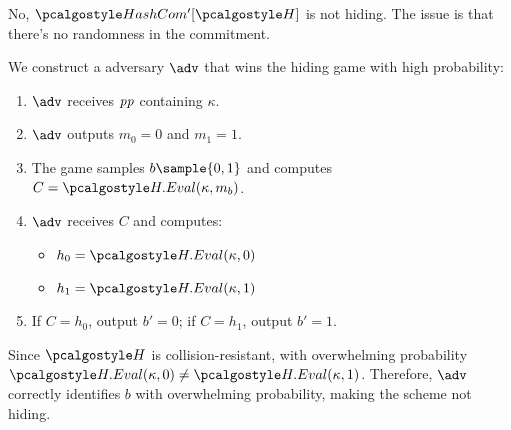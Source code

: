 \ifsolutions
\begin{mysolution}
  No, $\algo{HashCom'}[\algo{H}]$ is not hiding.
  The issue is that there's no randomness in the commitment.
  
  We construct a \ppt adversary $\adv$ that wins the hiding game with high probability:
  
  \begin{enumerate}
    \item $\adv$ receives $\mathit{pp}$ containing $\kappa$.
    \item $\adv$ outputs $m_0 = 0$ and $m_1 = 1$.
    \item The game samples $b \sample \{0, 1\}$ and computes $C = \algo{H.Eval}(\kappa, m_b)$.
    \item $\adv$ receives $C$ and computes:
      \begin{itemize}
        \item $h_0 = \algo{H.Eval}(\kappa, 0)$
        \item $h_1 = \algo{H.Eval}(\kappa, 1)$
      \end{itemize}
    \item If $C = h_0$, output $b' = 0$; if $C = h_1$, output $b' = 1$.
  \end{enumerate}
  
  Since $\algo{H}$ is collision-resistant, with overwhelming probability $\algo{H.Eval}(\kappa, 0) \neq \algo{H.Eval}(\kappa, 1)$.
  Therefore, $\adv$ correctly identifies $b$ with overwhelming probability, making the scheme not hiding.
\end{mysolution}
\fi

